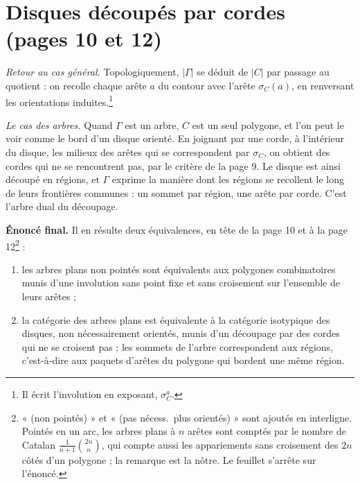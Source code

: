 \documentclass[11pt,a4paper]{article}
\begin{document}
\section*{Disques découpés par cordes (pages 10 et 12)}

\emph{Retour au cas général.} Topologiquement, $|\Gamma|$ se déduit de $|C|$
par passage au quotient : on recolle chaque arête $a$ du contour avec l'arête
$\sigma_{C}(a)$, en renversant les orientations induites.\footnote{Il écrit
l'involution en exposant, $\sigma_{C}^{a}$.}

\emph{Le cas des arbres.} Quand $\Gamma$ est un arbre, $C$ est un seul polygone,
et l'on peut le voir comme le bord d'un disque orienté. En joignant par une
corde, à l'intérieur du disque, les milieux des arêtes qui se correspondent par
$\sigma_{C}$, on obtient des cordes qui ne se rencontrent pas, par le critère de la
page 9. Le disque est ainsi découpé en régions, et $\Gamma$ exprime la manière
dont les régions se recollent le long de leurs frontières communes : un sommet
par région, une arête par corde. C'est l'arbre dual du découpage.

\textbf{Énoncé final.} Il en résulte deux équivalences, en tête de la page 10
et à la page 12\footnote{« (non pointés) » et « (pas nécess.\ plus orientés) » sont ajoutés en
interligne. Pointés en un arc, les arbres plans à $n$ arêtes sont comptés par le
nombre de Catalan $\frac{1}{n+1}\binom{2n}{n}$, qui compte aussi les
appariements sans croisement des $2n$ côtés d'un polygone ; la remarque est la
nôtre. Le feuillet s'arrête sur l'énoncé.} :
\begin{enumerate}
\item[(i)] les arbres plans non pointés sont équivalents aux polygones
combinatoires munis d'une involution sans point fixe et sans croisement sur
l'ensemble de leurs arêtes ;
\item[(ii)] la catégorie des arbres plans est équivalente à la catégorie
isotypique des disques, non nécessairement orientés, munis d'un découpage par des
cordes qui ne se croisent pas ; les sommets de l'arbre correspondent aux régions,
c'est-à-dire aux paquets d'arêtes du polygone qui bordent une même région.
\end{enumerate}
\end{document}
